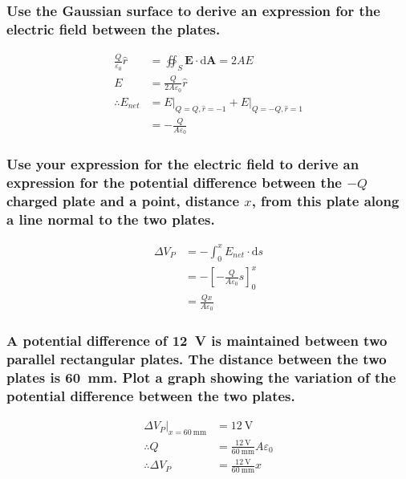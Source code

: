 \documentclass[a4paper]{scrartcl}
\begin{document}
\subsubsection{Use the Gaussian surface to derive an expression for the electric field between the plates.}
\begin{align*}
    \frac{Q}{\varepsilon_0} \hat{r} &= \oiint_S \mathbf{E} \cdot \mathrm{d}\mathbf{A} = 2 A E \\
    E &= \frac{Q}{2 A \varepsilon_0} \hat{r} \\
    \therefore E_{net} &= E \bigg|_{Q=Q, \hat{r} = -1} + E \bigg|_{Q=-Q, \hat{r} = 1} \\
    &= -\frac{Q}{A \varepsilon_0}
\end{align*}

\subsubsection{Use your expression for the electric field to derive an expression for the potential difference between the \(-Q\) charged plate and a point, distance \(x\), from this plate along a line normal to the two plates.}
\begin{align*}
    \Delta V_P &= -\int_0^x E_{net} \cdot \mathrm{d}s \\
    &= -\left[ -\frac{Q}{A \varepsilon_0} s \right]_0^x \\
    &= \frac{Q x}{A \varepsilon_0}
\end{align*}

\subsubsection{A potential difference of \SI{12}{\volt} is maintained between two parallel rectangular plates. The distance between the two plates is \SI{60}{\milli\metre}. Plot a graph showing the variation of the potential difference between the two plates.}
\begin{align*}
    \Delta V_P \bigg|_{x = \SI{60}{\milli\metre}} &= \SI{12}{\volt} \\
    \therefore Q &= \frac{\SI{12}{\volt}}{\SI{60}{\milli\metre}} A \varepsilon_0 \\
    \therefore \Delta V_P &= \frac{\SI{12}{\volt}}{\SI{60}{\milli\metre}} x
\end{align*}
\begin{center}
\end{center}
\end{document}
